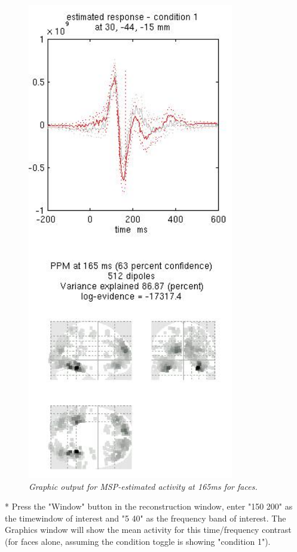 \begin{figure}
\begin{center}
\includegraphics[width=90mm]{multimodal/figures/figure_32_18}
\caption{\em  Graphic output for MSP-estimated activity at 165ms for faces.\label{fig_32_18}}
\end{center}
\end{figure}

* Press the "Window" button in the reconstruction window, enter "150 200" as the timewindow of interest and "5 40" as the frequency band of interest. The Graphics window will show the mean activity for this time/frequency contrast (for faces alone, assuming the condition toggle is showing "condition 1").

